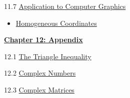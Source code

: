 \documentclass{ximera}
\begin{document}
11.7	\href{https://ximera.osu.edu/oerlinalg/LinearAlgebra/APP-0040/main}{Application to Computer Graphics}
\begin{itemize}
\item
\href{https://www.geogebra.org/m/yd5agbdg}{Homogeneous Coordinates}
\end{itemize}
	
\href{https://ximera.osu.edu/oerlinalg/LinearAlgebra/XLAChapter_appendix/main}{\textbf{Chapter 12: Appendix}}
	
12.1	\href{https://ximera.osu.edu/oerlinalg/LinearAlgebra/APX-0010/main}{The Triangle Inequality}
	
12.2	\href{https://ximera.osu.edu/oerlinalg/LinearAlgebra/APX-0020/main}{Complex Numbers}
	
12.3
\href{https://ximera.osu.edu/oerlinalg/LinearAlgebra/RTH-0050/main}{Complex Matrices}
\end{document}
